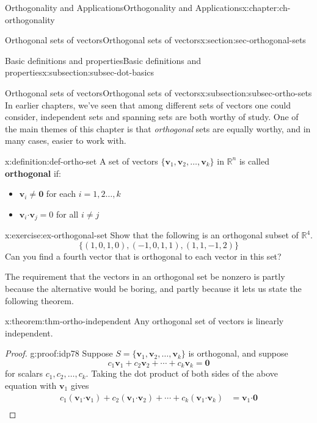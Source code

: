 \documentclass[oneside,10pt,]{book}
\newcommand{\terminology}[1]{\textbf{#1}}
\numberwithin{equation}{section}
\newcommand{\R}{\mathbb{R}}
\newcommand{\dotp}{\!\boldsymbol{\cdot}\!}
\newcommand{\vv}{\mathbf{v}}
\newcommand{\amp}{&}
\begin{document}
\begin{chapterptx}{Orthogonality and Applications}{}{Orthogonality and Applications}{}{}{x:chapter:ch-orthogonality}
\begin{sectionptx}{Orthogonal sets of vectors}{}{Orthogonal sets of vectors}{}{}{x:section:sec-orthogonal-sets}
\begin{subsectionptx}{Basic definitions and properties}{}{Basic definitions and properties}{}{}{x:subsection:subsec-dot-basics}
\end{subsectionptx}
%
%
\typeout{************************************************}
\typeout{************************************************}
%
\begin{subsectionptx}{Orthogonal sets of vectors}{}{Orthogonal sets of vectors}{}{}{x:subsection:subsec-ortho-sets}
In earlier chapters, we've seen that among different sets of vectors one could consider, independent sets and spanning sets are both worthy of study. One of the main themes of this chapter is that \emph{orthogonal} sets are equally worthy, and in many cases, easier to work with.%
\begin{definition}{}{x:definition:def-ortho-set}%
A set of vectors \(\{\vv_1,\vv_2,\ldots, \vv_k\}\) in \(\R^n\) is called \terminology{orthogonal} if:%
\begin{itemize}[label=\textbullet]
\item{}\(\vv_i\neq \mathbf{0}\) for each \(i=1,2\ldots, k\)%
\item{}\(\vv_i\dotp\vv_j = 0\) for all \(i\neq j\)%
\end{itemize}
%
\end{definition}
\begin{inlineexercise}{}{x:exercise:ex-orthogonal-set}%
Show that the following is an orthogonal subset of \(\R^4\).%
\begin{equation*}
\{(1,0,1,0), (-1,0,1,1), (1,1,-1,2)\}
\end{equation*}
Can you find a fourth vector that is orthogonal to each vector in this set?%
\end{inlineexercise}%
The requirement that the vectors in an orthogonal set be nonzero is partly because the alternative would be boring, and partly because it lets us state the following theorem.%
\begin{theorem}{}{}{x:theorem:thm-ortho-independent}%
Any orthogonal set of vectors is linearly independent.%
\end{theorem}
\begin{proof}{}{g:proof:idp78}
Suppose \(S=\{\vv_1,\vv_2,\ldots, \vv_k\}\) is orthogonal, and suppose%
\begin{equation*}
c_1\vv_1+c_2\vv_2+\cdots + c_k\vv_k = \mathbf{0}
\end{equation*}
for scalars \(c_1,c_2,\ldots, c_k\). Taking the dot product of both sides of the above equation with \(\vv_1\) gives%
\begin{align*}
c_1(\vv_1\dotp \vv_1)+c_2(\vv_1\dotp \vv_2)+\cdots +c_k(\vv_1\dotp \vv_k) \amp =\vv_1\dotp \mathbf{0}\\

\end{align*}
\end{proof}
\end{subsectionptx}
\end{sectionptx}
\end{chapterptx}
\end{document}
